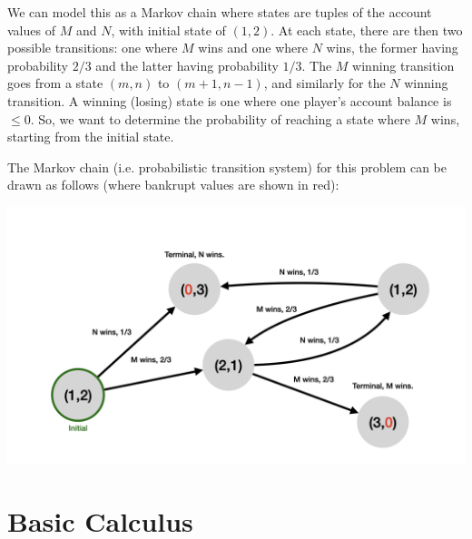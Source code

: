 \documentclass[10pt,a4paper]{article}
\begin{document}
We can model this as a Markov chain where states are tuples of the account values of $M$ and $N$, with initial state of $(1,2)$. At each state, there are then two possible transitions: one where $M$ wins and one where $N$ wins, the former having probability $2/3$ and the latter having probability $1/3$. The $M$ winning transition goes from a state $(m,n)$ to $(m+1,n-1)$, and similarly for the $N$ winning transition. A winning (losing) state is one where one player's account balance is $\leq 0$. So, we want to determine the probability of reaching a state where $M$ wins, starting from the initial state.

The Markov chain (i.e. probabilistic transition system) for this problem can be drawn as follows (where bankrupt values are shown in red):
\begin{center}
    \includegraphics[scale=0.1]{diagrams/prob_diagrams/prob_diagrams.002.png}
\end{center}

% 
% 

\section{Basic Calculus}
\end{document}
